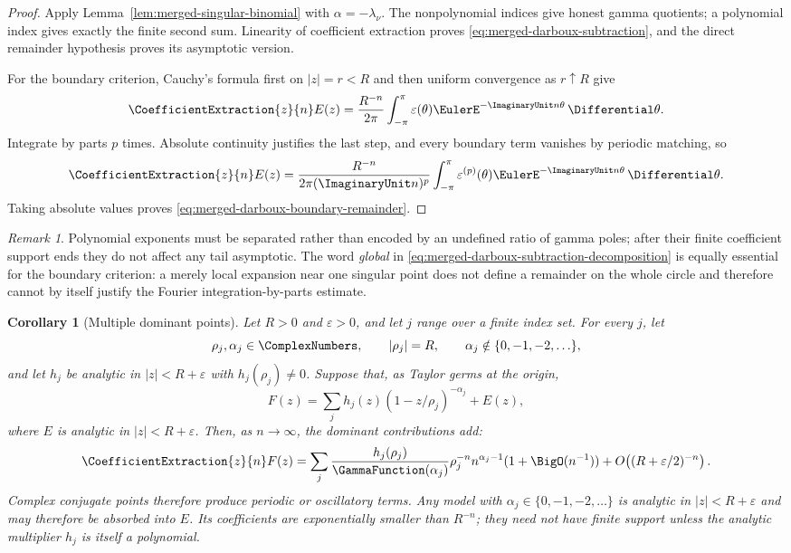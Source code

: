 \documentclass[11pt,a4paper,oneside,openany]{book}
\newtheorem{corollary}[theorem]{Corollary}
\theoremstyle{definition}
\theoremstyle{remark}
\newtheorem{remark}[theorem]{Remark}
\begin{document}
\begin{proof}
Apply Lemma~\ref{lem:merged-singular-binomial} with
$\alpha=-\lambda_\nu$.  The nonpolynomial indices give honest gamma
quotients; a polynomial index gives exactly the finite second sum.  Linearity
of coefficient extraction proves \eqref{eq:merged-darboux-subtraction}, and
the direct remainder hypothesis proves its asymptotic version.

For the boundary criterion, Cauchy's formula first on $|z|=r<R$ and then
uniform convergence as $r\uparrow R$ give
\begin{equation}
 \CoefficientExtraction{z}{n}E(z)=\frac{R^{-n}}{2\pi}
 \int_{-\pi}^{\pi}\varepsilon(\theta)
 \EulerE^{-\ImaginaryUnit n\theta}\,\Differential\theta.          \label{eq:merged-darboux-boundary-fourier}
\end{equation}
Integrate by parts $p$ times.  Absolute continuity justifies the last step,
and every boundary term vanishes by periodic matching, so
\[
 \CoefficientExtraction{z}{n}E(z)=\frac{R^{-n}}{2\pi(\ImaginaryUnit n)^p}
 \int_{-\pi}^{\pi}\varepsilon^{(p)}(\theta)
 \EulerE^{-\ImaginaryUnit n\theta}\,\Differential\theta.
\]
Taking absolute values proves
\eqref{eq:merged-darboux-boundary-remainder}.
\end{proof}

\begin{remark}
Polynomial exponents must be separated rather than encoded by an undefined
ratio of gamma poles; after their finite coefficient support ends they do not
affect any tail asymptotic.  The word \emph{global} in
\eqref{eq:merged-darboux-subtraction-decomposition} is equally essential for
the boundary criterion: a merely local expansion near one singular point does
not define a remainder on the whole circle and therefore cannot by itself
justify the Fourier integration-by-parts estimate.
\end{remark}

\begin{corollary}[Multiple dominant points]
Let $R>0$ and $\varepsilon>0$, and let $j$ range over a finite index set.
For every $j$, let
\[
 \rho_j,\alpha_j\in\ComplexNumbers,\qquad
 |\rho_j|=R,\qquad
 \alpha_j\notin\{0,-1,-2,\ldots\},
\]
and let $h_j$ be analytic in $|z|<R+\varepsilon$ with
$h_j(\rho_j)\ne0$.  Suppose that, as Taylor germs at the origin,
\[
 F(z)=\sum_jh_j(z)(1-z/\rho_j)^{-\alpha_j}+E(z),
\]
where $E$ is analytic in $|z|<R+\varepsilon$.  Then, as $n\to\infty$, the
dominant contributions add:
\begin{equation}
 \CoefficientExtraction{z}{n}F(z)=\sum_j\frac{h_j(\rho_j)}{\GammaFunction(\alpha_j)}
 \rho_j^{-n}n^{\alpha_j-1}(1+\BigO(n^{-1}))
 +O\!\left((R+\varepsilon/2)^{-n}\right).                           \label{eq:merged-multiple-transfer}
\end{equation}
Complex conjugate points therefore produce periodic or oscillatory terms.
Any model with $\alpha_j\in\{0,-1,-2,\ldots\}$ is analytic in
$|z|<R+\varepsilon$ and may therefore be absorbed into $E$.  Its coefficients
are exponentially smaller than $R^{-n}$; they need not have finite support
unless the analytic multiplier $h_j$ is itself a polynomial.
\end{corollary}
\end{document}
